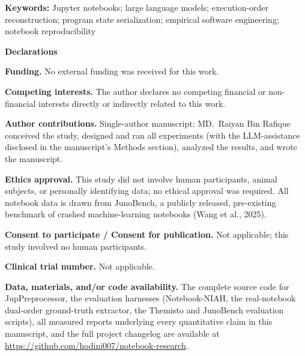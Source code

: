 \documentclass[11pt]{article}
\begin{document}
\vspace{1em}
\noindent\textbf{Keywords:} Jupyter notebooks; large language models;
execution-order reconstruction; program state serialization; empirical
software engineering; notebook reproducibility

\vspace{1.5em}
\noindent\textbf{Declarations}

\noindent\textbf{Funding.} No external funding was received for this work.

\noindent\textbf{Competing interests.} The author declares no competing
financial or non-financial interests directly or indirectly related to
this work.

\noindent\textbf{Author contributions.} Single-author manuscript: MD.\
Raiyan Bin Rafique conceived the study, designed and ran all experiments
(with the LLM-assistance disclosed in the manuscript's Methods section),
analyzed the results, and wrote the manuscript.

\noindent\textbf{Ethics approval.} This study did not involve human
participants, animal subjects, or personally identifying data; no ethical
approval was required. All notebook data is drawn from JunoBench, a
publicly released, pre-existing benchmark of crashed machine-learning
notebooks (Wang et al., 2025).

\noindent\textbf{Consent to participate / Consent for publication.} Not
applicable; this study involved no human participants.

\noindent\textbf{Clinical trial number.} Not applicable.

\noindent\textbf{Data, materials, and/or code availability.} The complete
source code for JupPreprocessor, the evaluation harnesses (Notebook-NIAH,
the real-notebook dual-order ground-truth extractor, the Themisto and
JunoBench evaluation scripts), all measured reports underlying every
quantitative claim in this manuscript, and the full project changelog are
available at \url{https://github.com/hodini007/notebook-research}.
\end{document}
